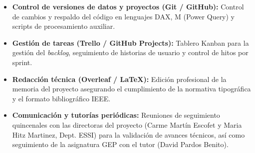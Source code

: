 \documentclass[12pt, a4paper, twoside]{report}
\begin{document}
\begin{itemize}
    \item \textbf{Control de versiones de datos y proyectos (Git / GitHub):} Control de cambios y respaldo del código en lenguajes DAX, M (Power Query) y scripts de procesamiento auxiliar.
    \item \textbf{Gestión de tareas (Trello / GitHub Projects):} Tablero Kanban para la gestión del \textit{backlog}, seguimiento de historias de usuario y control de hitos por sprint.
    \item \textbf{Redacción técnica (Overleaf / \LaTeX):} Edición profesional de la memoria del proyecto asegurando el cumplimiento de la normativa tipográfica y el formato bibliográfico IEEE.
    \item \textbf{Comunicación y tutorías periódicas:} Reuniones de seguimiento quincenales con las directoras del proyecto (Carme Martín Escofet y Maria Hitz Martinez, Dept. ESSI) para la validación de avances técnicos, así como seguimiento de la asignatura GEP con el tutor (David Pardos Benito).
\end{itemize}


\clearpage


\end{document}
